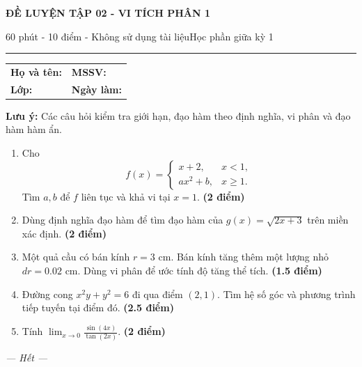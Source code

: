 \documentclass[11pt,a4paper]{article}
\newcommand{\examtitle}[4]{\begin{center}{\Large\bfseries\color{hcmusblue}#1}\par\vspace{3pt}{\large\bfseries #2}\par\vspace{3pt}\small #3\quad\textbullet\quad #4\end{center}\vspace{5pt}\hrule\vspace{8pt}}
\newcommand{\studentline}{\begin{tabularx}{\textwidth}{X X}\textbf{Họ và tên:} \hrulefill & \textbf{MSSV:} \hrulefill\\[7pt]\textbf{Lớp:} \hrulefill & \textbf{Ngày làm:} \hrulefill\end{tabularx}\vspace{8pt}}
\newcommand{\points}[1]{\hfill\textbf{(#1 điểm)}}
\begin{document}
\examtitle{ĐỀ LUYỆN TẬP 02 - VI TÍCH PHÂN 1}{VI TÍCH PHÂN 1 - HCMUS (bộ luyện tập)}{60 phút - 10 điểm - Không sử dụng tài liệu}{Học phần giữa kỳ 1}

\studentline
\begin{notebox}\textbf{Lưu ý:} Các câu hỏi kiểm tra giới hạn, đạo hàm theo định nghĩa, vi phân và đạo hàm hàm ẩn.\end{notebox}
\begin{enumerate}
\item Cho
\[
f(x)=\begin{cases}x+2,&x<1,\\ ax^2+b,&x\ge 1.\end{cases}
\]
Tìm $a,b$ để $f$ liên tục và khả vi tại $x=1$. \points{2}
\item Dùng định nghĩa đạo hàm để tìm đạo hàm của $g(x)=\sqrt{2x+3}$ trên miền xác định. \points{2}
\item Một quả cầu có bán kính $r=3$ cm. Bán kính tăng thêm một lượng nhỏ $dr=0.02$ cm. Dùng vi phân để ước tính độ tăng thể tích. \points{1.5}
\item Đường cong $x^2y+y^2=6$ đi qua điểm $(2,1)$. Tìm hệ số góc và phương trình tiếp tuyến tại điểm đó. \points{2.5}
\item Tính $\displaystyle\lim_{x\to0}\frac{\sin(4x)}{\tan(2x)}$. \points{2}
\end{enumerate}
\vfill\begin{center}\textit{--- Hết ---}\end{center}
\end{document}
